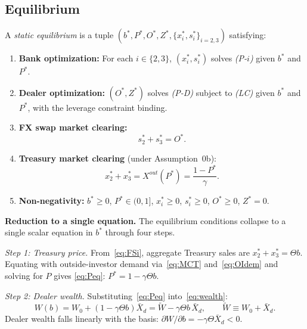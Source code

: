 \subsection{Equilibrium}
\label{subsec:equilibrium}

\begin{definition}
\label{def:equilibrium}
A \textit{static equilibrium} is a tuple $(b^*, P^*, O^*, Z^*, \{x_i^*, s_i^*\}_{i=2,3})$
satisfying:
\begin{enumerate}[label=(\roman*)]
  \item \textbf{Bank optimization:} For each $i \in \{2,3\}$, $(x_i^*, s_i^*)$ solves
    \emph{(P-$i$)} given $b^*$ and $P^*$.
  \item \textbf{Dealer optimization:} $(O^*, Z^*)$ solves \emph{(P-D)} subject to \emph{(LC)}
    given $b^*$ and $P^*$, with the leverage constraint binding.
  \item \textbf{FX swap market clearing:}
    \begin{equation}
      s_2^* + s_3^* = O^*. \tag{MC-S} \label{eq:MCS}
    \end{equation}
  \item \textbf{Treasury market clearing} (under Assumption~0b):
    \begin{equation}
      x_2^* + x_3^* = X^{out}(P^*) = \frac{1-P^*}{\gamma}. \tag{MC-T} \label{eq:MCT}
    \end{equation}
  \item \textbf{Non-negativity:} $b^* \geq 0$, $P^* \in (0,1]$, $x_i^* \geq 0$, $s_i^* \geq 0$,
    $O^* \geq 0$, $Z^* = 0$.
\end{enumerate}
\end{definition}

\textbf{Reduction to a single equation.} The equilibrium conditions collapse to a single scalar
equation in $b^*$ through four steps.

\textit{Step 1: Treasury price.} From~\eqref{eq:FSi}, aggregate Treasury sales are $x_2^* + x_3^* = \Theta b$.
Equating with outside-investor demand via~\eqref{eq:MCT} and~\eqref{eq:OIdem} and solving for $P$
gives \eqref{eq:Peq}: $P^* = 1 - \gamma\Theta b$.

\textit{Step 2: Dealer wealth.} Substituting~\eqref{eq:Peq} into~\eqref{eq:wealth}:
\begin{equation}
  W(b) = W_0 + (1 - \gamma\Theta b)\bar{X}_d = \tilde{W} - \gamma\Theta b\,\bar{X}_d,
  \qquad \tilde{W} \equiv W_0 + \bar{X}_d.
  \tag{W-b}
  \label{eq:Wb}
\end{equation}
Dealer wealth falls linearly with the basis: $\partial W/\partial b = -\gamma\Theta\bar{X}_d < 0$.

